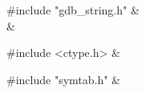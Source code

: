 \medskip
\begin{cxreftabi}
{\stt \#include "gdb\_string.h"} &\\
\hspace*{0.2in}{\stt \#include <string.h>} &\\
\end{cxreftabi}

\medskip
\begin{cxreftabi}
{\stt \#include <ctype.h>} &\\
\end{cxreftabi}

\medskip
\begin{cxreftabi}
{\stt \#include "symtab.h"} &\\
\end{cxreftabi}

